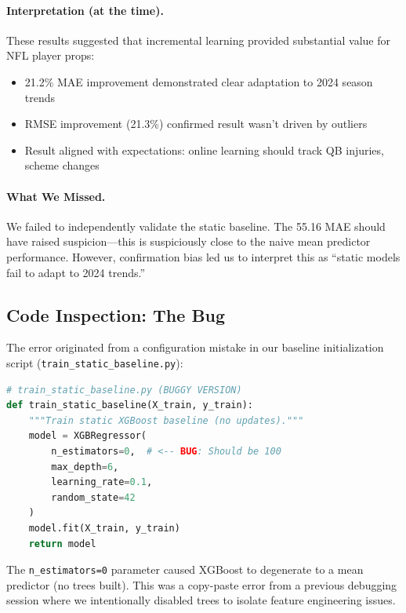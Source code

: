 \paragraph{Interpretation (at the time).} These results suggested that incremental learning provided substantial value for NFL player props:

\begin{itemize}
\item 21.2\% MAE improvement demonstrated clear adaptation to 2024 season trends
\item RMSE improvement (21.3\%) confirmed result wasn't driven by outliers
\item Result aligned with expectations: online learning should track QB injuries, scheme changes
\end{itemize}

\paragraph{What We Missed.} We failed to independently validate the static baseline. The 55.16 MAE should have raised suspicion—this is suspiciously close to the naive mean predictor performance. However, confirmation bias led us to interpret this as ``static models fail to adapt to 2024 trends.''

\subsection{Code Inspection: The Bug}

The error originated from a configuration mistake in our baseline initialization script (\texttt{train\_static\_baseline.py}):

\begin{lstlisting}[language=Python,caption={Buggy Static Baseline Code (Nov 10)}]
# train_static_baseline.py (BUGGY VERSION)
def train_static_baseline(X_train, y_train):
    """Train static XGBoost baseline (no updates)."""
    model = XGBRegressor(
        n_estimators=0,  # <-- BUG: Should be 100
        max_depth=6,
        learning_rate=0.1,
        random_state=42
    )
    model.fit(X_train, y_train)
    return model
\end{lstlisting}

\noindent The \texttt{n\_estimators=0} parameter caused XGBoost to degenerate to a mean predictor (no trees built). This was a copy-paste error from a previous debugging session where we intentionally disabled trees to isolate feature engineering issues.


